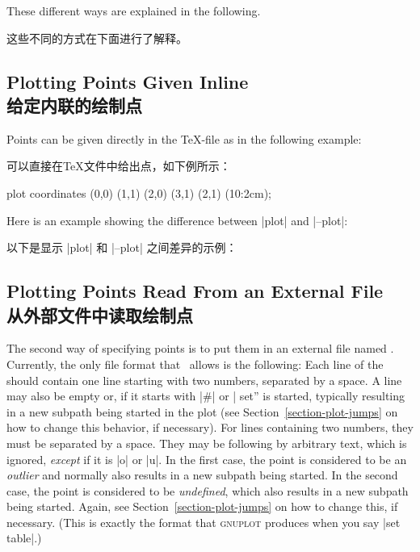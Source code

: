 These different ways are explained in the following.

这些不同的方式在下面进行了解释。


\subsection{Plotting Points Given Inline\\给定内联的绘制点}

Points can be given directly in the \TeX-file as in the following example:

可以直接在\TeX 文件中给出点，如下例所示：

\begin{codeexample}[]
\tikz \draw plot coordinates {(0,0) (1,1) (2,0) (3,1) (2,1) (10:2cm)};
\end{codeexample}

Here is an example showing the difference between |plot| and |--plot|:

以下是显示 |plot| 和 |--plot| 之间差异的示例：

\begin{codeexample}[]
\end{codeexample}


\subsection{Plotting Points Read From an External File\\从外部文件中读取绘制点}

The second way of specifying points is to put them in an external file named
. Currently, the only file format that \tikzname\ allows is the
following: Each line of the  should contain one line starting
with two numbers, separated by a space. A line may also be empty or, if it
starts with |#| or |%
set'' is started, typically resulting in a new subpath being started in the
plot (see Section~\ref{section-plot-jumps} on how to change this behavior, if
necessary). For lines containing two numbers, they must be separated by a
space. They may be following by arbitrary text, which is ignored, \emph{except}
if it is |o| or |u|. In the first case, the point is considered to be an
\emph{outlier} and normally also results in a new subpath being started. In the
second case, the point is considered to be \emph{undefined}, which also results
in a new subpath being started. Again, see Section~\ref{section-plot-jumps} on
how to change this, if necessary. (This is exactly the format that
\textsc{gnuplot} produces when you say |set table|.)

